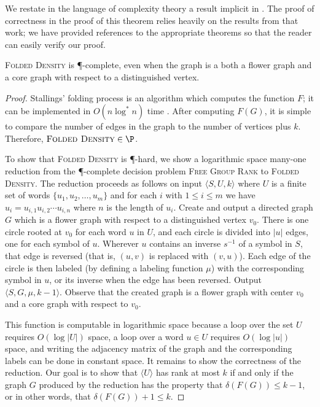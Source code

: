 \documentclass{article}
\newcommand{\FGR}{\textsc{Free Group Rank}}
\newcommand{\FD}{\textsc{Folded Density}}
\newcommand{\gen}[1]{\langle #1 \rangle}
\begin{document}
We restate in the language of complexity theory a result implicit in \cite{km02}.
The proof of correctness in the proof of this theorem relies heavily on the results from that work; we have provided references to the appropriate theorems so that the reader can easily verify our proof.
\begin{theorem}\label{thm:fdpcomplete}
  \FD{} is \P-complete, even when the graph is a both a flower graph and a core graph with respect to a distinguished vertex.
\end{theorem}
\begin{proof}
  Stallings' folding process \cite[Algorithm~5.4]{stallings83} is an algorithm which computes the function $F$; it can be implemented in $O(n \log^* n)$ time \cite{touikan06}.
  After computing $F(G)$, it is simple to compare the number of edges in the graph to the number of vertices plus $k$.
  Therefore, $\FD \in \P$.

  To show that \FD{} is \P-hard, we show a logarithmic space many-one reduction from the \P-complete decision problem \FGR{} to \FD.
  The reduction proceeds as follows on input $\langle S, U, k \rangle$ where $U$ is a finite set of words $\{u_1, u_2, \dotsc, u_m\}$ and for each $i$ with $1 \leq i \leq m$ we have $u_i = u_{i, 1}u_{i, 2}\dotsb u_{i, n}$ where $n$ is the length of $u_i$.
  Create and output a directed graph $G$ which is a flower graph with respect to a distinguished vertex $v_0$.
  There is one circle rooted at $v_0$ for each word $u$ in $U$, and each circle is divided into $|u|$ edges, one for each symbol of $u$.
  Wherever $u$ contains an inverse $s^{-1}$ of a symbol in $S$, that edge is reversed (that is, $(u, v)$ is replaced with $(v, u)$).
  Each edge of the circle is then labeled (by defining a labeling function $\mu$) with the corresponding symbol in $u$, or its inverse when the edge has been reversed.
  Output $\langle S, G, \mu, k - 1 \rangle$.
  Observe that the created graph is a flower graph with center $v_0$ and a core graph with respect to $v_0$.

  This function is computable in logarithmic space because a loop over the set $U$ requires $O(\log |U|)$ space, a loop over a word $u \in U$ requires $O(\log |u|)$ space, and writing the adjacency matrix of the graph and the corresponding labels can be done in constant space.
  It remains to show the correctness of the reduction.
  Our goal is to show that $\gen{U}$ has rank at most $k$ if and only if the graph $G$ produced by the reduction has the property that $\delta(F(G)) \leq k - 1$, or in other words, that $\delta(F(G)) + 1 \leq k$.


\end{proof}
\end{document}
